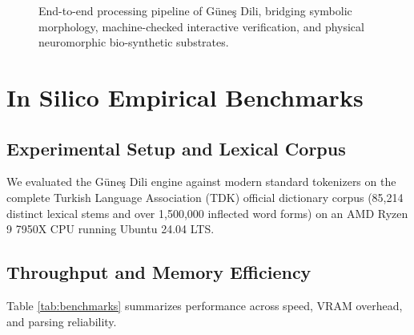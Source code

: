 \documentclass[11pt,letterpaper]{article}
\begin{document}
\begin{figure}[t]
\centering
{}
\caption{End-to-end processing pipeline of G\"{u}ne\c{s} Dili, bridging symbolic morphology, machine-checked interactive verification, and physical neuromorphic bio-synthetic substrates.}
\label{fig:pipeline}
\end{figure}

\section{In Silico Empirical Benchmarks}

\subsection{Experimental Setup and Lexical Corpus}

We evaluated the G\"{u}ne\c{s} Dili engine against modern standard tokenizers on the complete Turkish Language Association (TDK) official dictionary corpus (85,214 distinct lexical stems and over 1,500,000 inflected word forms) on an AMD Ryzen 9 7950X CPU running Ubuntu 24.04 LTS.

\subsection{Throughput and Memory Efficiency}

Table \ref{tab:benchmarks} summarizes performance across speed, VRAM overhead, and parsing reliability.
\end{document}

